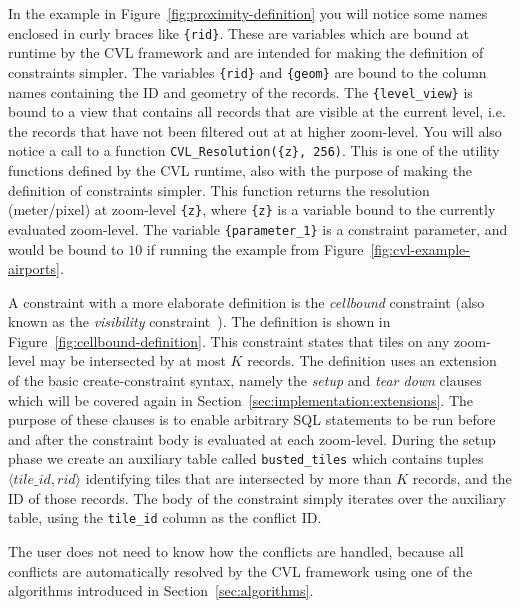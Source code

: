 In the example in Figure~\ref{fig:proximity-definition} you will notice some names enclosed in curly braces like \texttt{\{rid\}}. These are variables which are bound at runtime by the CVL framework and are intended for making the definition of constraints simpler. The variables \texttt{\{rid\}} and \texttt{\{geom\}} are bound to the column names containing the ID and geometry of the records. The \texttt{\{level\_view\}} is bound to a view that contains all records that are visible at the current level, i.e. the records that have not been filtered out at at higher zoom-level. You will also notice a call to a function \texttt{CVL\_Resolution(\{z\}, 256)}. This is one of the utility functions defined by the CVL runtime, also with the purpose of making the definition of constraints simpler. This function returns the resolution (meter/pixel) at zoom-level \texttt{\{z\}}, where \texttt{\{z\}} is a variable bound to the currently evaluated zoom-level. The variable \texttt{\{parameter\_1\}} is a constraint parameter, and would be bound to $10$ if running the example from Figure~\ref{fig:cvl-example-airports}.

A constraint with a more elaborate definition is the \emph{cellbound} constraint (also known as the \emph{visibility} constraint~\cite{sarma2012fusiontables}). The definition is shown in Figure~\ref{fig:cellbound-definition}. This constraint states that tiles on any zoom-level may be intersected by at most $K$ records. The definition uses an extension of the basic create-constraint syntax, namely the \emph{setup} and \emph{tear down} clauses which will be covered again in Section~\ref{sec:implementation:extensions}. The purpose of these clauses is to enable arbitrary SQL statements to be run before and after the constraint body is evaluated at each zoom-level. During the setup phase we create an auxiliary table called \texttt{busted\_tiles} which contains tuples $\langle tile\_id, rid \rangle$ identifying tiles that are intersected by more than $K$ records, and the ID of those records. The body of the constraint simply iterates over the auxiliary table, using the \texttt{tile\_id} column as the conflict ID.

The user does not need to know how the conflicts are handled, because all conflicts are automatically resolved by the CVL framework using one of the algorithms introduced in Section~\ref{sec:algorithms}.


